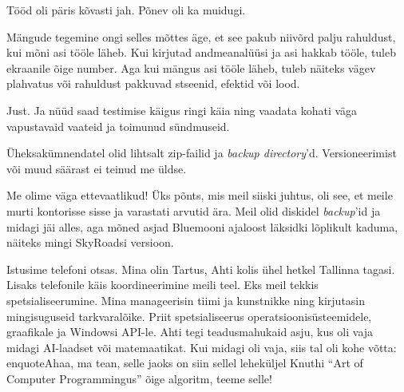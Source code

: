 
Tööd oli päris kõvasti jah. Põnev oli ka muidugi.


Mängude tegemine ongi selles mõttes äge, et see pakub niivõrd palju rahuldust, kui mõni asi tööle läheb. Kui kirjutad andmeanalüüsi ja asi hakkab
tööle, tuleb ekraanile õige number. Aga kui mängus asi tööle läheb, tuleb 
näiteks vägev plahvatus või rahuldust pakkuvad 
stseenid, efektid või lood. 


Just. Ja nüüd saad testimise käigus ringi käia ning vaadata
kohati väga vapustavaid vaateid ja toimunud sündmuseid.


Üheksakümnendatel olid lihtsalt zip-failid ja \emph{backup directory}'d. 
Versioneerimist või muud säärast ei teinud me üldse. 


Me olime väga ettevaatlikud! Üks põnts, mis meil siiski juhtus, oli see, et meile murti 
kontorisse sisse ja varastati arvutid ära. Meil olid diskidel \emph{backup}'id ja 
midagi jäi alles, aga mõned asjad Bluemooni ajaloost läksidki lõplikult 
kaduma, näiteks mingi SkyRoadsi versioon.


Istusime telefoni otsas. Mina olin Tartus, Ahti kolis ühel 
hetkel Tallinna tagasi. Lisaks telefonile käis koordineerimine meili 
teel. Eks meil tekkis spetsialiseerumine. Mina manageerisin tiimi ja 
kunstnikke ning kirjutasin mingisuguseid tarkvaralõike. Priit spetsialiseerus operatsioonisüsteemidele, graafikale ja Windowsi API-le. Ahti tegi 
teadusmahukaid asju, kus oli vaja midagi AI-laadset või 
matemaatikat. Kui midagi oli vaja, siis tal oli kohe võtta: enquote{Ahaa, ma tean, selle jaoks 
on siin sellel leheküljel Knuthi \enquote{Art of Computer Programmingus} õige algoritm, teeme selle!}

